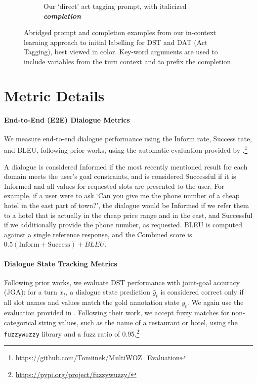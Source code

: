 \documentclass[11pt]{article}
\newcommand{\dstcolor}[1]{\textcolor{dst-color}{#1}}
\begin{document}
\begin{figure}[h]
\begin{subfigure}[b]{0.49\textwidth}
        \caption{Our `direct' act tagging prompt, with italicized \dstcolor{\textit{\textbf{completion}}}}
        \label{fig:direct-act-tag-prompt}
    \end{subfigure}
    \caption{Abridged prompt and completion examples from our in-context learning approach to initial labelling for DST and DAT (Act Tagging), best viewed in color. Key-word arguments are used to include variables from the turn context and to prefix the completion}
    \label{fig:direct-prompt-examples}
\end{figure}


\section{Metric Details}
\label{app:metric_details}
\paragraph{End-to-End (E2E) Dialogue Metrics}
We measure end-to-end dialogue performance using the Inform rate, Success rate, and BLEU, following prior works, using the automatic evaluation provided by \citet{nekvinda-dusek-2021-shades}.\footnote{\href{https://github.com/Tomiinek/MultiWOZ_Evaluation}{https://github.com/Tomiinek/MultiWOZ\_Evaluation}}

A dialogue is considered Informed if the most recently mentioned result for each domain meets the user's goal constraints, and is considered Successful if it is Informed and all values for requested slots are presented to the user. 
For example, if a user were to ask `Can you give me the phone number of a cheap hotel in the east part of town?', the dialogue would be Informed if we refer them to a hotel that is actually in the cheap price range and in the east, and Successful if we additionally provide the phone number, as requested. 
BLEU is computed against a single reference response, and the Combined score is $0.5(\text{Inform} + \text{Success}) + BLEU$.

\paragraph{Dialogue State Tracking Metrics} Following prior works, we evaluate DST performance with joint-goal accuracy (JGA): for a turn $x_t$, a dialogue state prediction $\hat{y}_t$ is considered correct only if all slot names and values match the gold annotation state $y_t$. We again use the evaluation provided in \citet{nekvinda-dusek-2021-shades}. Following their work, we accept fuzzy matches for non-categorical string values, such as the name of a restaurant or hotel, using the \texttt{fuzzywuzzy} library and a fuzz ratio of 0.95.\footnote{\href{https://pypi.org/project/fuzzywuzzy/}{https://pypi.org/project/fuzzywuzzy/}} 
\end{document}
